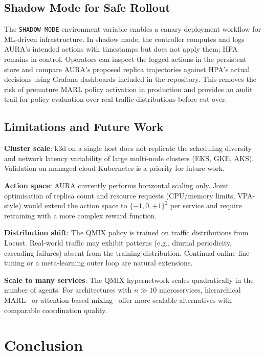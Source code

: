 \documentclass[conference]{IEEEtran}
\begin{document}
\subsection{Shadow Mode for Safe Rollout}

The \texttt{SHADOW\_MODE} environment variable enables a canary
deployment workflow for ML-driven infrastructure. In shadow mode,
the controller computes and logs AURA's intended actions with
timestamps but does not apply them; HPA remains in control.
Operators can inspect the logged actions in the persistent store
and compare AURA's proposed replica trajectories against HPA's
actual decisions using Grafana dashboards included in the
repository. This removes the risk of premature MARL policy
activation in production and provides an audit trail for policy
evaluation over real traffic distributions before cut-over.

\subsection{Limitations and Future Work}

\textbf{Cluster scale}: k3d on a single host does not replicate
the scheduling diversity and network latency variability of large
multi-node clusters (EKS, GKE, AKS). Validation on managed cloud
Kubernetes is a priority for future work.

\textbf{Action space}: AURA currently performs horizontal scaling
only. Joint optimisation of replica count and resource requests
(CPU/memory limits, VPA-style) would extend the action space to
$\{-1,0,+1\}^2$ per service and require retraining with a more
complex reward function.

\textbf{Distribution shift}: The QMIX policy is trained on traffic
distributions from Locust. Real-world traffic may exhibit
patterns (e.g., diurnal periodicity, cascading failures) absent from
the training distribution. Continual online fine-tuning or a
meta-learning outer loop are natural extensions.

\textbf{Scale to many services}: The QMIX hypernetwork scales
quadratically in the number of agents. For architectures with
$n \gg 10$ microservices, hierarchical MARL~\cite{Pateria2021} or
attention-based mixing~\cite{Iqbal2019} offer more scalable
alternatives with comparable coordination quality.

\section{Conclusion}
\label{sec:conclusion}
\end{document}
